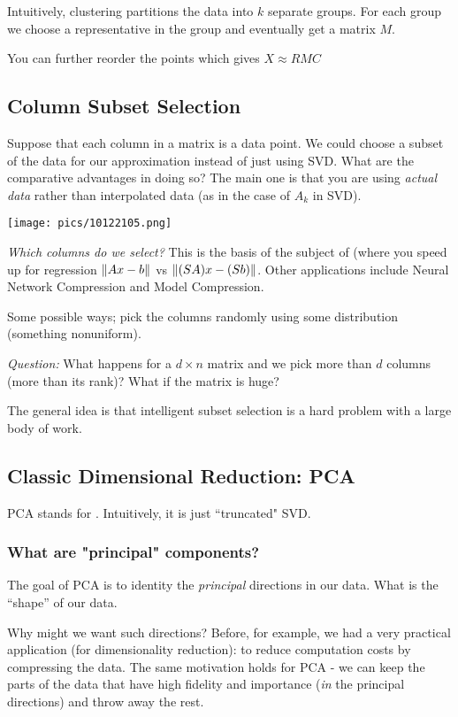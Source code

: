 \documentclass[11pt]{scrartcl}
\begin{document}
Intuitively, clustering partitions the data into $k$ separate groups. For each group we choose a representative in the group and eventually get a matrix $M$. 

You can further reorder the points which gives $X \approx RMC$

\subsection{Column Subset Selection}

Suppose that each column in a matrix is a data point. We could choose a subset of the data for our approximation instead of just using SVD. What are the comparative advantages in doing so? The main one is that you are using \textit{actual data} rather than interpolated data (as in the case of $A_k$ in SVD). 
\begin{center}
    \texttt{[image: pics/10122105.png]}
\end{center}
\textit{Which columns do we select?} This is the basis of the subject of  (where you speed up for regression $\left\lVert Ax-b\right\rVert$ vs $\left\lVert(SA)x-(Sb)\right\rVert$. Other applications include Neural Network Compression and Model Compression. 

Some possible ways; pick the columns randomly using some distribution (something nonuniform). 

\textit{Question:} What happens for a $d \times n$ matrix and we pick more than $d$ columns (more than its rank)? What if the matrix is huge?

The general idea is that intelligent subset selection is a hard problem with a large body of work. 

\subsection{Classic Dimensional Reduction: PCA}

PCA stands for . Intuitively, it is just ``truncated" SVD. 

\subsubsection{What are "principal" components?}
The goal of PCA is to identity the \textit{principal} directions in our data. What is the ``shape'' of our data.

Why might we want such directions? Before, for example, we had a very practical application (for dimensionality reduction): to reduce computation costs by compressing the data. The same motivation holds for PCA - we can keep the parts of the data that have high fidelity and importance (\textit{in} the principal directions) and throw away the rest.
\end{document}
